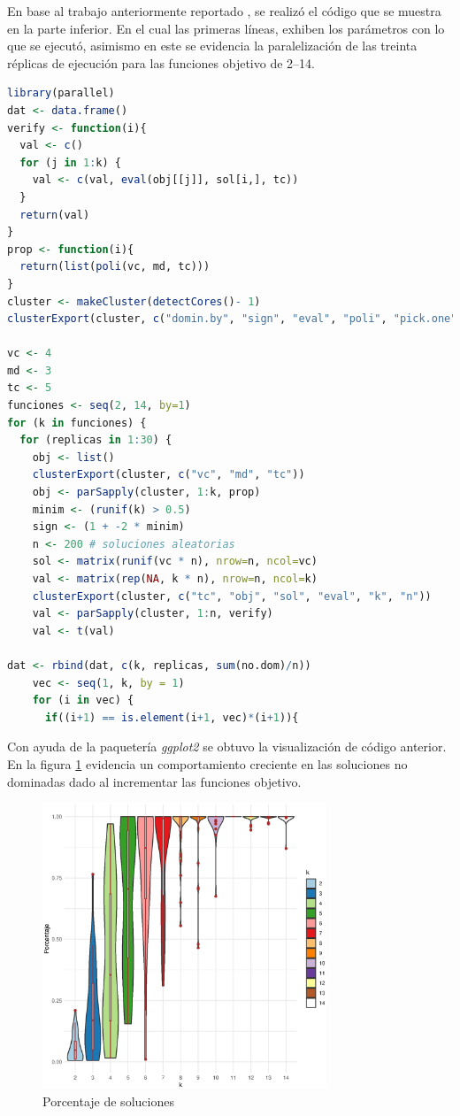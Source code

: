 \documentclass[12pt, letterpaper] {article}
\begin{document}
En base al trabajo anteriormente reportado \cite{P11}, se realizó el código que se muestra en la parte inferior. En el cual las primeras líneas, exhiben los parámetros  con lo que se ejecutó, asimismo en este se evidencia la paralelización de las treinta réplicas de ejecución para las funciones objetivo de 2--14.\\

\begin{lstlisting}[language=R]
library(parallel)
dat <- data.frame() 
verify <- function(i){
  val <- c()
  for (j in 1:k) {
    val <- c(val, eval(obj[[j]], sol[i,], tc))
  }
  return(val)
}
prop <- function(i){
  return(list(poli(vc, md, tc)))
}
cluster <- makeCluster(detectCores()- 1)
clusterExport(cluster, c("domin.by", "sign", "eval", "poli", "pick.one"))

vc <- 4
md <- 3
tc <- 5
funciones <- seq(2, 14, by=1)
for (k in funciones) {
  for (replicas in 1:30) {
    obj <- list()
    clusterExport(cluster, c("vc", "md", "tc"))
    obj <- parSapply(cluster, 1:k, prop)
    minim <- (runif(k) > 0.5)
    sign <- (1 + -2 * minim)
    n <- 200 # soluciones aleatorias
    sol <- matrix(runif(vc * n), nrow=n, ncol=vc)
    val <- matrix(rep(NA, k * n), nrow=n, ncol=k)
    clusterExport(cluster, c("tc", "obj", "sol", "eval", "k", "n"))
    val <- parSapply(cluster, 1:n, verify)
    val <- t(val)

dat <- rbind(dat, c(k, replicas, sum(no.dom)/n))
    vec <- seq(1, k, by = 1)
    for (i in vec) {
      if((i+1) == is.element(i+1, vec)*(i+1)){
\end{lstlisting}

Con ayuda de la paquetería \textit{ggplot2} \cite{plot} se obtuvo la visualización de código anterior. En la figura \ref{PS} evidencia un comportamiento creciente en las soluciones no dominadas dado al incrementar las funciones objetivo.

\begin{figure}[H]
\centering\includegraphics[width=85mm]{numdfunobjetiva.eps}
\caption{Porcentaje de soluciones}
\label{PS}
\end{figure}
\end{document}

